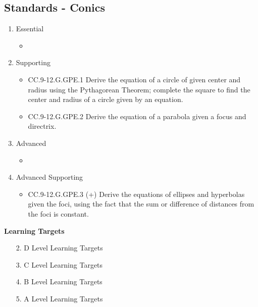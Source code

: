 \documentclass{article}
\begin{document}
\subsection*{Standards - Conics}
\begin{enumerate}
	\item Essential
	\begin{itemize}
		\item
	\end{itemize}		
	\item Supporting
	\begin{itemize}
		\item CC.9-12.G.GPE.1  Derive the equation of a circle of given center and radius using the Pythagorean Theorem; complete the square to find the center and radius of a circle given by an equation.
		\item CC.9-12.G.GPE.2 Derive the equation of a parabola given a focus and directrix.
	\end{itemize}
	\item Advanced
	\begin{itemize}
		\item
	\end{itemize}
	\item Advanced Supporting
	\begin{itemize}
		\item CC.9-12.G.GPE.3 (+)  Derive the equations of ellipses and hyperbolas given the foci, using the fact that the sum or difference of distances from the foci is constant.
	\end{itemize}
\end{enumerate}

\newpage
\noindent
\textbf{Learning Targets}
\begin{enumerate}
	\item [2.] D Level Learning Targets
	\item [3.] C Level Learning Targets
	\item [4.] B Level Learning Targets
	\item [5.] A Level Learning Targets
\end{enumerate}
\end{document}
